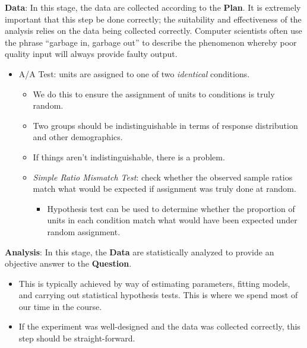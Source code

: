 \begin{framed}
    \textbf{Data}: In this stage, the data are collected according to the \textbf{Plan}.
    It is extremely important that this step be done correctly; the suitability and effectiveness
    of the analysis relies on the data being collected correctly. Computer scientists often
    use the phrase
    ``garbage in, garbage out'' to describe the phenomenon whereby poor
    quality input will always provide faulty output.
    \begin{itemize}
        \item A/A Test: units are assigned to one of two \emph{identical} conditions.
              \begin{itemize}
                  \item We do this to ensure the assignment of units to conditions is truly random.
                  \item Two groups should be indistinguishable in terms of response distribution
                        and other demographics.
                  \item If things aren't indistinguishable, there is a problem.
                  \item \emph{Simple Ratio Mismatch Test}: check whether the observed sample ratios
                        match what would be expected if assignment was truly done at random.
                        \begin{itemize}
                            \item Hypothesis test can be used to determine whether the proportion
                                  of units in each condition match what would have been expected under
                                  random assignment.
                        \end{itemize}
              \end{itemize}
    \end{itemize}
\end{framed}
\begin{framed}
    \textbf{Analysis}: In this stage, the \textbf{Data} are statistically analyzed
    to provide an objective answer to the \textbf{Question}.
    \begin{itemize}
        \item This is typically achieved by way of estimating parameters, fitting models,
              and carrying out statistical hypothesis tests. This is where we spend most of
              our time in the course.
        \item If the experiment was well-designed and the data was collected correctly, this
              step should be straight-forward.
    \end{itemize}
\end{framed}
